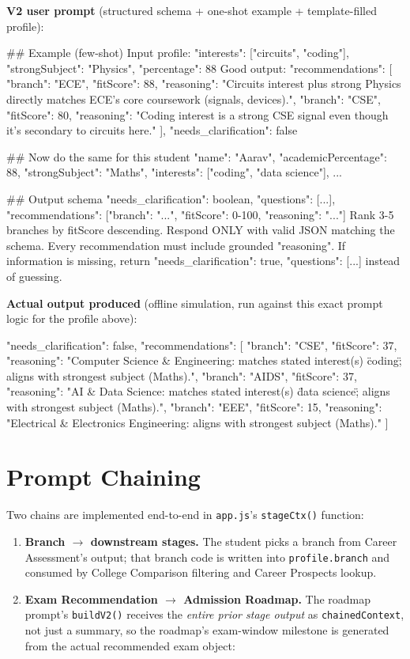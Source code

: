 \documentclass[11pt]{article}
\begin{document}
\textbf{V2 user prompt} (structured schema + one-shot example + template-filled profile):
\begin{code}
## Example (few-shot)
Input profile: {"interests": ["circuits", "coding"], "strongSubject": "Physics", "percentage": 88}
Good output:
{
  "recommendations": [
    {"branch": "ECE", "fitScore": 88, "reasoning": "Circuits interest plus strong Physics
     directly matches ECE's core coursework (signals, devices)."},
    {"branch": "CSE", "fitScore": 80, "reasoning": "Coding interest is a strong CSE signal
     even though it's secondary to circuits here."}
  ],
  "needs_clarification": false
}

## Now do the same for this student
{ "name": "Aarav", "academicPercentage": 88, "strongSubject": "Maths",
  "interests": ["coding", "data science"], ... }

## Output schema
{ "needs_clarification": boolean, "questions": [...],
  "recommendations": [{"branch": "...", "fitScore": 0-100, "reasoning": "..."}] }
Rank 3-5 branches by fitScore descending. Respond ONLY with valid JSON matching the
schema. Every recommendation must include grounded "reasoning". If information is
missing, return {"needs_clarification": true, "questions": [...]} instead of guessing.
\end{code}

\textbf{Actual output produced} (offline simulation, run against this exact prompt logic for the profile above):
\begin{code}
{
  "needs_clarification": false,
  "recommendations": [
    {"branch": "CSE",  "fitScore": 37, "reasoning": "Computer Science & Engineering: matches
       stated interest(s) \"coding\"; aligns with strongest subject (Maths)."},
    {"branch": "AIDS", "fitScore": 37, "reasoning": "AI & Data Science: matches stated
       interest(s) \"data science\"; aligns with strongest subject (Maths)."},
    {"branch": "EEE",  "fitScore": 15, "reasoning": "Electrical & Electronics Engineering:
       aligns with strongest subject (Maths)."}
  ]
}
\end{code}

\section{Prompt Chaining}
\label{sec:chaining}

Two chains are implemented end-to-end in \texttt{app.js}'s \texttt{stageCtx()} function:

\begin{enumerate}
\item \textbf{Branch $\to$ downstream stages.} The student picks a branch from Career Assessment's output; that branch code is written into \texttt{profile.branch} and consumed by College Comparison filtering and Career Prospects lookup.
\item \textbf{Exam Recommendation $\to$ Admission Roadmap.} The roadmap prompt's \texttt{buildV2()} receives the \emph{entire prior stage output} as \texttt{chainedContext}, not just a summary, so the roadmap's exam-window milestone is generated from the actual recommended exam object:
\end{enumerate}
\end{document}
